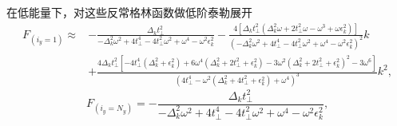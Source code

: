 在低能量下，对这些反常格林函数做低阶泰勒展开
\begin{equation}
\begin{aligned}
F_{(i_y=1)}\approx&-\frac{\Delta_k  t_\perp^2}{-\Delta_k ^2 \omega ^2+4 t_\perp^4-4 t_\perp^2 \omega ^2+\omega ^4-\omega ^2 \epsilon_k ^2}-\frac{4  \left[\Delta_k  t_\perp^2 \left(\Delta_k ^2 \omega +2 t_\perp^2 \omega -\omega ^3+\omega  \epsilon_k ^2\right)\right]}{\left(-\Delta_k ^2 \omega ^2+4 t_\perp^4-4 t_\perp^2 \omega ^2+\omega ^4-\omega ^2 \epsilon_k ^2\right)^2}k\\
&+\frac{4 \Delta_k   t_\perp^2 \left[-4 t_\perp^4 \left(\Delta_k ^2+\epsilon_k ^2\right)+6 \omega ^4 \left(\Delta_k ^2+2 t_\perp^2+\epsilon_k ^2\right)-3 \omega ^2 \left(\Delta_k ^2+2 t_\perp^2+\epsilon_k ^2\right)^2-3 \omega ^6\right]}{\left(4 t_\perp^4-\omega ^2 \left(\Delta_k ^2+4 t_\perp^2+\epsilon_k ^2\right)+\omega ^4\right)^3}k^2,
\end{aligned}
\end{equation}
\begin{equation}
F_{(i_y=N_y)}=-\frac{\Delta_k  t_\perp^2}{-\Delta_k ^2 \omega ^2+4 t_\perp^4-4 t_\perp^2 \omega ^2+\omega ^4-\omega ^2 \epsilon_k ^2},
\end{equation}


